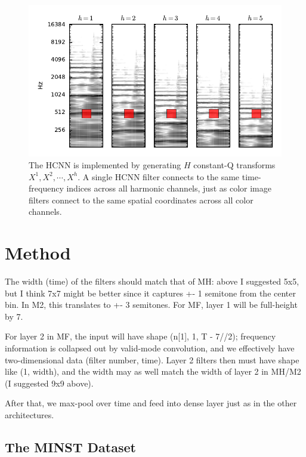 \documentclass{article}
\begin{document}
\begin{figure}
    \includegraphics[width=\columnwidth]{figs/hcnn}
    \caption{The HCNN is implemented by generating $H$ constant-Q transforms $X^1, X^2, \cdots, X^h$.
    A single HCNN filter connects to the same time-frequency indices across all harmonic channels, just as color image filters connect to the same spatial coordinates across all color channels.}
\label{fig:hcnn}
\end{figure}

\section{Method}\label{sec:typeset_text}

The width (time) of the filters should match that of MH: above I suggested 5x5, but I think 7x7 might be better since it captures +- 1 semitone from the center bin. In M2, this translates to +- 3 semitones. For MF, layer 1 will be full-height by 7.

For layer 2 in MF, the input will have shape (n[1], 1, T - 7//2); frequency information is collapsed out by valid-mode convolution, and we effectively have two-dimensional data (filter number, time). Layer 2 filters then must have shape like (1, width), and the width may as well match the width of layer 2 in MH/M2 (I suggested 9x9 above).

After that, we max-pool over time and feed into dense layer just as in the other architectures.




\subsection{The MINST Dataset}\label{subsec:body}
\end{document}
